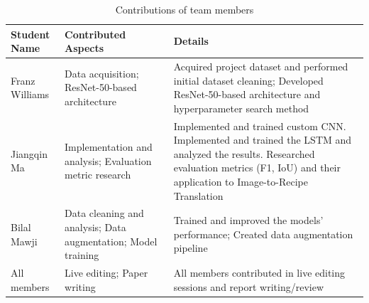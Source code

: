 \documentclass[10pt,twocolumn,letterpaper]{article}
\begin{document}
\begin{table}[ht]
\centering
\begin{tabular}{|l|p{4cm}|p{9cm}|}
\hline
Student Name & Contributed Aspects & Details \\
\hline\hline
Franz Williams & Data acquisition; ResNet-50-based architecture & Acquired project dataset and performed initial dataset cleaning; Developed ResNet-50-based architecture and hyperparameter search method \\
Jiangqin Ma & Implementation and analysis; Evaluation metric research & Implemented and trained custom CNN. Implemented and trained the LSTM and analyzed the results. Researched evaluation metrics (F1, IoU) and their application to Image-to-Recipe Translation \\
Bilal Mawji & Data cleaning and analysis; Data augmentation; Model training & Trained and improved the models' performance; Created data augmentation pipeline \\
\hline
All members & Live editing; Paper writing & All members contributed in live editing sessions and report writing/review \\
\hline
\end{tabular}
\caption{Contributions of team members}
\label{tab:contributions}
\end{table}
\end{document}
